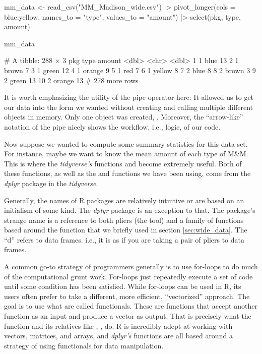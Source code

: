 \begin{inR}
mm_data <- read_csv("MM_Madison_wide.csv") |>
  pivot_longer(cols = blue:yellow, names_to = "type", values_to = "amount") |>
  select(pkg, type, amount)

mm_data
\end{inR}
\begin{outR}
# A tibble: 288 × 3
     pkg type   amount
   <dbl> <chr>   <dbl>
 1     1 blue       13
 2     1 brown       7
 3     1 green      12
 4     1 orange      9
 5     1 red         7
 6     1 yellow      8
 7     2 blue        8
 8     2 brown       3
 9     2 green      13
10     2 orange     13
# 278 more rows
\end{outR}

It is worth emphasizing the utility of the pipe operator here: It allowed us to get our data into the form we wanted without creating and calling multiple different objects in memory. Only one object was created, . Moreover, the ``arrow-like'' notation of the pipe \R{|>} nicely shows the workflow, i.e., logic, of our code.

Now suppose we wanted to compute some summary statistics for this data set.  For instance, maybe we want to know the mean amount of each type of M\&M. This is where the \textit{tidyverse's} functions  and  become extremely useful. Both of these functions, as well as the  and  functions we have been using, come from the \textit{dplyr} package in the \textit{tidyverse}. 

\begin{mdframed}[nobreak = true, style = miscFrame, frametitle = \Large\IMFellEnglish Box 3.1: Why is it called \textit{dplyr}?]
\color{darkgray}
\IMFellEnglish

Generally, the names of R packages are relatively intuitive or are based on an initialism of some kind. The \textit{dplyr} package is an exception to that. The package's strange name is a reference to both pliers (the tool) and a family of functions based around the  function that we briefly used in section \ref{sec:wide_data}. The \enquote{d} refers to data frames. i.e., it is as if you are taking a pair of pliers to data frames.

A common go-to strategy of programmers generally is to use for-loops to do much of the computational grunt work. For-loops just repeatedly execute a set of code until some condition has been satisfied. While for-loops can be used in R, its users often prefer to take a different, more efficient, \enquote{vectorized} approach. The goal is to use what are called \glspl{functional}. These are functions that accept another function as an input and produce a vector as output. That is precisely what the  function and its relatives like , ,  do. R is incredibly adept at working with vectors, matrices, and arrays, and \textit{dplyr's} functions are all based around a strategy of using functionals for data manipulation.
\end{mdframed}

